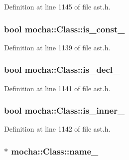 Definition at line 1145 of file ast.h.

\hypertarget{classmocha_1_1_class_a33b68ef9c9cdb7099cc5a4b39531a7b2}{
\subsubsection[{is\_\-const\_\-}]{\setlength{\rightskip}{0pt plus 5cm}bool {\bf mocha::Class::is\_\-const\_\-}}}
\label{classmocha_1_1_class_a33b68ef9c9cdb7099cc5a4b39531a7b2}


Definition at line 1139 of file ast.h.

\hypertarget{classmocha_1_1_class_ac159c23063ecdb2471dbcc145f0ab874}{
\subsubsection[{is\_\-decl\_\-}]{\setlength{\rightskip}{0pt plus 5cm}bool {\bf mocha::Class::is\_\-decl\_\-}}}
\label{classmocha_1_1_class_ac159c23063ecdb2471dbcc145f0ab874}


Definition at line 1141 of file ast.h.

\hypertarget{classmocha_1_1_class_a62eeaa52563724e00042117136658cde}{
\subsubsection[{is\_\-inner\_\-}]{\setlength{\rightskip}{0pt plus 5cm}bool {\bf mocha::Class::is\_\-inner\_\-}}}
\label{classmocha_1_1_class_a62eeaa52563724e00042117136658cde}


Definition at line 1142 of file ast.h.

\hypertarget{classmocha_1_1_class_a059fb140e1ab511f2d40ac3f6792d108}{
\subsubsection[{name\_\-}]{$\ast$ {\bf mocha::Class::name\_\-}}}
\label{classmocha_1_1_class_a059fb140e1ab511f2d40ac3f6792d108}


